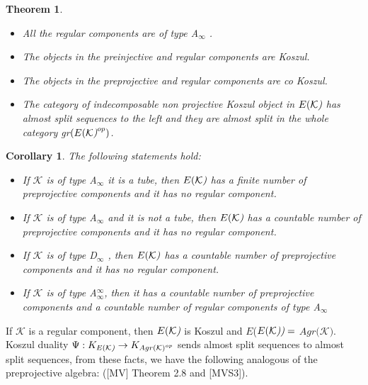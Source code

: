 \documentclass{amsart}
\newtheorem{theorem}{Theorem}
\theoremstyle{plain}
\newtheorem{corollary}{Corollary}
\numberwithin{equation}{section}
\begin{document}
\begin{theorem}
\begin{itemize}
\item[(6)] All the regular components are of type A$_{\infty }$ .

\item[(7)] The objects in the preinjective and regular components are Koszul.

\item[(8)] The objects in the preprojective and regular components are co
Koszul.

\item[(9)] The category of indecomposable non projective Koszul object in $E(\mathcal{K}\emph{)}$ has almost split sequences to the left and they are
almost split in the whole category gr$(E(\mathcal{K}\emph{)}^{op})$.
\end{itemize}
\end{theorem}

\begin{corollary} The following statements hold:
\begin{itemize}

\item[(a)] If $\mathcal{K}$ is of type A$_{\infty }$ it is a tube, then $E(\mathcal{K}\emph{)}$ has a finite number of preprojective components and it
has no regular component.

\item[(b)] If $\mathcal{K}$ is of type A$_{\infty }$ and it is not a tube,
then $E(\mathcal{K}\emph{)}$ has a countable number of preprojective
components and it has no regular component.

\item[(c)] If $\mathcal{K}$ is of type D$_{\infty }$ , then $E(\mathcal{K}\emph{)}$ has a countable number of preprojective components and it has no
regular component.

\item[(b)] If $\mathcal{K}$ is of type A$_{\infty }^{\infty }$, then it has
a countable number of preprojective components and a countable number of
regular components of type A$_{\infty }$
\end{itemize}
\end{corollary}

If $\mathcal{K}$ is a regular component, then $E(\mathcal{K}\emph{)}$ is
Koszul and $E$($E(\mathcal{K}\emph{))}=$ $Agr(\mathcal{K)}.$ Koszul duality $\Psi :K_{E(\mathcal{K}\emph{)}}\rightarrow K_{Agr(\mathcal{K)}^{op}}$ sends
almost split sequences to almost split sequences, from these facts, we have
the following analogous of the preprojective algebra: ([MV] Theorem 2.8 and
[MVS3]).
\end{document}
